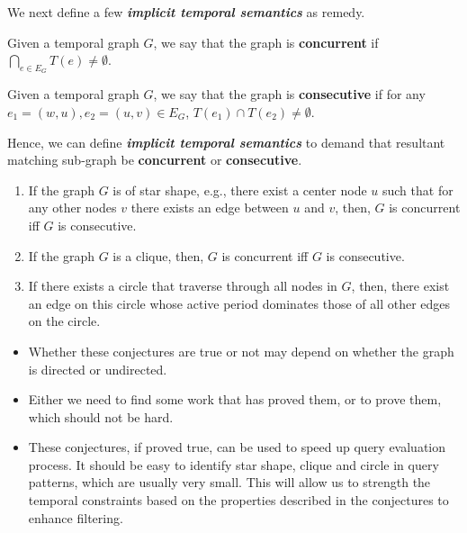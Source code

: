 We next define a few {\bf {\em implicit temporal semantics}} as remedy. 

\begin{defn}
Given a temporal graph $G$, we say that the graph is {\bf concurrent} if
$\displaystyle\bigcap_{e \in E_G}T(e) \not= \emptyset$.
\end{defn}

\begin{defn}
Given a temporal graph $G$, we say that the graph is {\bf consecutive} if for
any $e_1 = (w,u) ,e_2=(u,v) \in E_G$, $T(e_1) \cap T(e_2) \not= \emptyset$.
\end{defn}

Hence, we can define {\bf {\em implicit temporal semantics}} to demand that
resultant matching sub-graph be {\bf concurrent }or {\bf consecutive}.

\SmallSpace
{}
 \begin{enumerate}
	\item If the graph $G$ is of star shape, e.g., there exist a center node
          $u$ such that for any other nodes $v$ there exists an edge between $u$
          and $v$, then, $G$ is concurrent iff $G$ is consecutive.
	\item If the graph $G$ is a clique, then, $G$ is concurrent iff $G$ is
          consecutive.
	\item If there exists a circle that traverse through all nodes in $G$,
          then, there exist an edge on this circle whose active period dominates
          those of all other edges on the circle.
	
\end{enumerate}

\begin{itemize}
	\item Whether these conjectures are true or not may depend on whether
          the graph is directed or undirected.
	\item Either we need to find some work that has proved them, or to prove
          them, which should not be hard.
	\item These conjectures, if proved true, can be used to speed up query
          evaluation process. It should be easy to identify star shape, clique
          and circle in query patterns, which are usually very small. This will
          allow us to strength the temporal constraints based on the properties
          described in the conjectures to enhance filtering.

\end{itemize}
